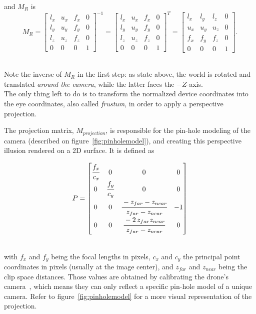 and $M_R$ is
\begin{equation}
	M_R = \begin{bmatrix}
			l_x & u_x & f_x & 0\\
			l_y & u_y & f_y & 0\\
			l_z & u_z & f_z & 0\\
			0 & 0 & 0 & 1
		\end{bmatrix}^{-1}
		= \begin{bmatrix}
			l_x & u_x & f_x & 0\\
			l_y & u_y & f_y & 0\\
			l_z & u_z & f_z & 0\\
			0 & 0 & 0 & 1
		\end{bmatrix}^{T}
		= \begin{bmatrix}
			l_x & l_y & l_z & 0\\
			u_x & u_y & u_z & 0\\
			f_x & f_y & f_z & 0\\
			0 & 0 & 0 & 1
		\end{bmatrix}.
\end{equation}

~\\Note the inverse of $M_R$ in the first step: as state above, the world is
rotated and translated \emph{around the camera}, while the latter faces the
$-Z$-axis.\\

The only thing left to do is to transform the normalized device coordinates
into the eye coordinates, also called \emph{frustum}, in order to apply a
perspective projection.

The projection matrix, $M_{projection}$, is responsible for the pin-hole
modeling of the camera (described on figure~\ref{fig:pinholemodel}), and
creating this perspective illusion rendered on a 2D surface. It is defined as

\begin{equation} \label{equ:projection}
	P = \begin{bmatrix}
			\cfrac{f_x}{c_x} & 0 & 0 & 0 \\
			0 & \cfrac{f_y}{c_y} & 0 & 0 \\
			0 & 0 & \cfrac{-z_{far} -z_{near}}{z_{far} - z_{near}} & -1\\
			0 & 0 & \cfrac{-2 \, z_{far} z_{near}}{z_{far}-z_{near}} & 0
		\end{bmatrix}
\end{equation}

~\\with $f_x$ and $f_y$ being the focal lengths in pixels, $c_x$ and $c_y$ the
principal point coordinates in pixels (usually at the image center), and
$z_{far}$ and $z_{near}$ being the clip space distances. Those values are
obtained by calibrating the drone's camera~\cite{OpenCVCalibration}, which
means they can only reflect a specific pin-hole model of a unique camera. Refer
to figure~\ref{fig:pinholemodel} for a more visual representation of the
projection.


